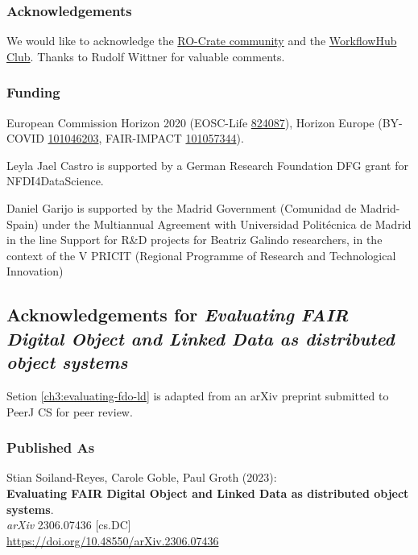 \subsubsection*{Acknowledgements}

We would like to acknowledge the
\href{https://www.researchobject.org/ro-crate/community.html}{RO-Crate
community} and the
\href{https://about.workflowhub.eu/project/acknowledgements/}{WorkflowHub
Club}. Thanks to Rudolf Wittner for valuable comments.

\subsubsection*{Funding}

European Commission Horizon 2020 (EOSC-Life
\href{https://cordis.europa.eu/project/id/824087}{824087}), Horizon
Europe (BY-COVID
\href{https://cordis.europa.eu/project/id/101046203}{101046203},
FAIR-IMPACT
\href{https://cordis.europa.eu/project/id/101057344}{101057344}).

Leyla Jael Castro is supported by a German Research Foundation DFG grant
for NFDI4DataScience.

Daniel Garijo is supported by the Madrid Government (Comunidad de
Madrid-Spain) under the Multiannual Agreement with Universidad
Politécnica de Madrid in the line Support for R\&D projects for Beatriz
Galindo researchers, in the context of the V PRICIT (Regional Programme
of Research and Technological Innovation)


% 

\subsection{Acknowledgements for \textit{Evaluating FAIR Digital Object and Linked Data as distributed object systems}}

Setion \vref{ch3:evaluating-fdo-ld} is adapted from an arXiv preprint submitted to PeerJ CS for peer review.

\subsubsection*{Published As}

Stian Soiland-Reyes, Carole Goble, Paul Groth (2023):\\
\textbf{Evaluating FAIR Digital Object and Linked Data as distributed object systems}.\\
\emph{arXiv} 2306.07436 [cs.DC] \\
\url{https://doi.org/10.48550/arXiv.2306.07436}

